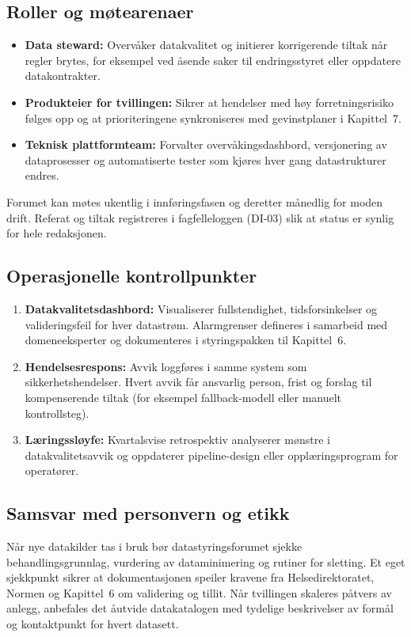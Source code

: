 \subsection{Roller og m\o tearenaer}
\begin{itemize}
    \item \textbf{Data steward:} Overv\aa ker datakvalitet og initierer korrigerende tiltak n\aa r regler brytes, for eksempel ved \aa sende saker til endringsstyret eller oppdatere datakontrakter.
    \item \textbf{Produkteier for tvillingen:} Sikrer at hendelser med h\o y forretningsrisiko f\o lges opp og at prioriteringene synkroniseres med gevinstplaner i Kapittel~7.
    \item \textbf{Teknisk plattformteam:} Forvalter overv\aa kingsdashbord, versjonering av dataprosesser og automatiserte tester som kj\o res hver gang datastrukturer endres.
\end{itemize}
Forumet kan m\o tes ukentlig i innf\o ringsfasen og deretter m\aa nedlig for moden drift. Referat og tiltak registreres i fagfelleloggen (DI-03) slik at status er synlig for hele redaksjonen.

\subsection{Operasjonelle kontrollpunkter}
\begin{enumerate}
    \item \textbf{Datakvalitetsdashbord:} Visualiserer fullstendighet, tidsforsinkelser og valideringsfeil for hver datastr\o m. Alarmgrenser defineres i samarbeid med domeneeksperter og dokumenteres i styringspakken til Kapittel~6.
    \item \textbf{Hendelsesrespons:} Avvik loggf\o res i samme system som sikkerhetshendelser. Hvert avvik f\aa r ansvarlig person, frist og forslag til kompenserende tiltak (for eksempel fallback-modell eller manuelt kontrollsteg).
    \item \textbf{L\ae ringssl\o yfe:} Kvartalsvise retrospektiv analyserer m\o nstre i datakvalitetsavvik og oppdaterer pipeline-design eller oppl\ae ringsprogram for operat\o rer.
\end{enumerate}

\subsection{Samsvar med personvern og etikk}
N\aa r nye datakilder tas i bruk b\o r datastyringsforumet sjekke behandlingsgrunnlag, vurdering av dataminimering og rutiner for sletting. Et eget sjekkpunkt sikrer at dokumentasjonen speiler kravene fra Helsedirektoratet, Normen og Kapittel~6 om validering og tillit. N\aa r tvillingen skaleres p\aa tvers av anlegg, anbefales det \aa utvide datakatalogen med tydelige beskrivelser av form\aa l og kontaktpunkt for hvert datasett.

